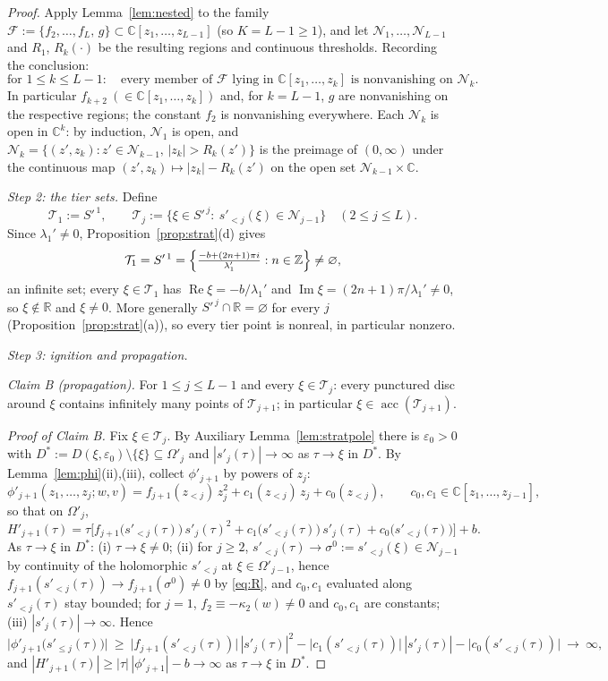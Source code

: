 \documentclass[11pt]{article}
\theoremstyle{definition}
\theoremstyle{remark}
\theoremstyle{plain}
\newcommand{\R}{\mathbb{R}}
\newcommand{\C}{\mathbb{C}}
\newcommand{\Z}{\mathbb{Z}}
\newcommand{\cN}{\mathcal{N}}
\newcommand{\cT}{\mathcal{T}}
\newcommand{\cF}{\mathcal{F}}
\newcommand{\acc}{\operatorname{acc}}
\begin{document}
\begin{proof}
Apply Lemma~\ref{lem:nested} to the family
$\cF:=\{f_2,\dots,f_L,\,g\}\subset\C[z_1,\dots,z_{L-1}]$ (so $K=L-1\ge1$), and let
$\cN_1,\dots,\cN_{L-1}$ and $R_1$, $R_k(\cdot)$ be the resulting regions and continuous
thresholds.  Recording the conclusion:
\begin{equation}\tag{R}\label{eq:R}
\text{for }1\le k\le L-1:\quad
\text{every member of }\cF\text{ lying in }\C[z_1,\dots,z_k]
\text{ is nonvanishing on }\cN_k .
\end{equation}
In particular $f_{k+2}\ (\in\C[z_1,\dots,z_k])$ and, for $k=L-1$, $g$ are nonvanishing
on the respective regions; the constant $f_2$ is nonvanishing everywhere.  Each $\cN_k$
is open in $\C^k$: by induction, $\cN_1$ is open, and
$\cN_k=\{(z',z_k):z'\in\cN_{k-1},\,|z_k|>R_k(z')\}$ is the preimage of
$(0,\infty)$ under the continuous map $(z',z_k)\mapsto|z_k|-R_k(z')$ on the open set
$\cN_{k-1}\times\C$.

\emph{Step 2: the tier sets.}  Define
\[
\cT_1:=S'^{\,1},\qquad
\cT_j:=\big\{\xi\in S'^{\,j}:\ s'_{<j}(\xi)\in\cN_{j-1}\big\}\quad(2\le j\le L).
\]
Since $\lambda_1'\neq0$, Proposition~\ref{prop:strat}(d) gives
\[
\cT_1=S'^{\,1}=\Bigl\{\tfrac{-b+(2n+1)\pi i}{\lambda_1'}:n\in\Z\Bigr\}\neq\varnothing,
\]
an infinite set; every $\xi\in\cT_1$ has
$\operatorname{Re}\xi=-b/\lambda_1'$ and
$\operatorname{Im}\xi=(2n+1)\pi/\lambda_1'\neq0$, so $\xi\notin\R$ and $\xi\neq0$.
More generally $S'^{\,j}\cap\R=\varnothing$ for every $j$
(Proposition~\ref{prop:strat}(a)), so every tier point is nonreal, in particular
nonzero.

\emph{Step 3: ignition and propagation.}

\emph{Claim B (propagation).}  For $1\le j\le L-1$ and every $\xi\in\cT_j$: every
punctured disc around $\xi$ contains infinitely many points of $\cT_{j+1}$; in
particular $\xi\in\acc(\cT_{j+1})$.

\emph{Proof of Claim B.}  Fix $\xi\in\cT_j$.  By Auxiliary
Lemma~\ref{lem:stratpole} there is $\varepsilon_0>0$ with
$D^*:=D(\xi,\varepsilon_0)\setminus\{\xi\}\subseteq\Omega'_j$ and
$|s'_j(\tau)|\to\infty$ as $\tau\to\xi$ in $D^*$.  By Lemma~\ref{lem:phi}(ii),(iii),
collect $\phi'_{j+1}$ by powers of $z_j$:
\[
\phi'_{j+1}(z_1,\dots,z_j;w,v)
=f_{j+1}(z_{<j})\,z_j^2+c_1(z_{<j})\,z_j+c_0(z_{<j}),
\qquad c_0,c_1\in\C[z_1,\dots,z_{j-1}],
\]
so that on $\Omega'_j$,
\[
H'_{j+1}(\tau)=\tau\Big[f_{j+1}\big(s'_{<j}(\tau)\big)\,s'_j(\tau)^2
+c_1\big(s'_{<j}(\tau)\big)\,s'_j(\tau)+c_0\big(s'_{<j}(\tau)\big)\Big]+b .
\]
As $\tau\to\xi$ in $D^*$: (i) $\tau\to\xi\neq0$; (ii) for $j\ge2$,
$s'_{<j}(\tau)\to\sigma^0:=s'_{<j}(\xi)\in\cN_{j-1}$ by continuity of the holomorphic
$s'_{<j}$ at $\xi\in\Omega'_{j-1}$, hence
$f_{j+1}(s'_{<j}(\tau))\to f_{j+1}(\sigma^0)\neq0$ by \eqref{eq:R}, and
$c_0,c_1$ evaluated along $s'_{<j}(\tau)$ stay bounded; for $j=1$,
$f_2\equiv-\kappa_2(w)\neq0$ and $c_0,c_1$ are constants; (iii)
$|s'_j(\tau)|\to\infty$.  Hence
\[
\big|\phi'_{j+1}\big(s'_{\le j}(\tau)\big)\big|
\ \ge\ \big|f_{j+1}(s'_{<j}(\tau))\big|\,|s'_j(\tau)|^2
-\big|c_1(s'_{<j}(\tau))\big|\,|s'_j(\tau)|-\big|c_0(s'_{<j}(\tau))\big|
\ \longrightarrow\ \infty,
\]
and $|H'_{j+1}(\tau)|\ge|\tau|\,|\phi'_{j+1}|-b\to\infty$ as $\tau\to\xi$ in $D^*$.


\end{proof}
\end{document}
